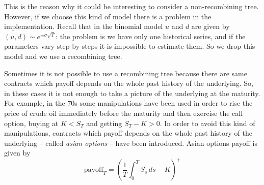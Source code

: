 This is the reason why it could be interesting to consider a non-recombining tree. However, if we choose this kind of model there is a problem in the implementation. Recall that in the binomial model $u$ and $d$ are given by $(u,d)\sim e^{\pm\sigma\sqrt{T}}$: the problem is we have only one historical series, and if the parameters vary step by steps it is impossible to estimate them. So we drop this model and we use a recombining tree.
\begin{remark}
    Sometimes it is not possible to use a recombining tree because there are same contracts which payoff depends on the whole past history of the underlying. So, in these cases it is not enough to take a picture of the underlying at the maturity. For example, in the 70s some manipulations have been used in order to rise the price of crude oil immediately before the maturity and then exercise the call option, buying at $K<S_T$ and getting $S_T-K>0$. In order to avoid this kind of manipulations, contracts which payoff depends on the whole past history of the underlying -- called \emph{asian options} -- have been introduced. Asian options payoff is given by
    \begin{equation}
        \mbox{payoff}_T = \left(\dfrac{1}{T}\int^T_0 S_s\,ds-K\right)^+
    \end{equation}
\end{remark}
